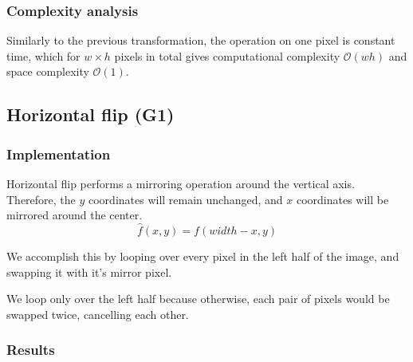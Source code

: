 \documentclass[12pt]{article}
\theoremstyle{definition}
\begin{document}
\subsubsection{Complexity analysis}

Similarly to the previous transformation,
the operation on one pixel is constant time, which for $w \times h$ pixels in total gives computational complexity $\mathcal{O}(wh)$
and space complexity $\mathcal{O}(1)$.

\vspace{5em}
\pagebreak[3]
\subsection{Horizontal flip (G1)}

\subsubsection{Implementation}

Horizontal flip performs a mirroring operation around the vertical axis.
Therefore, the $y$ coordinates will remain unchanged, and $x$ coordinates will be mirrored around the center.
\begin{equation}
    \hat{f}(x,y) = f(width - x, y)
\end{equation}

We accomplish this by looping over every pixel in the left half of the image,
and swapping it with it's mirror pixel.

We loop only over the left half
because otherwise, each pair of pixels would be swapped twice,
cancelling each other.

\subsubsection{Results}
\end{document}
